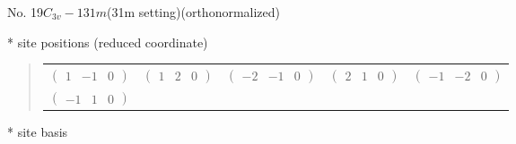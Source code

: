 \documentclass[fleqn,9pt,landscape]{jsarticle}
\begin{document}
\newpage
\begin{center}
\LARGE
No. 19\quad$C_{3v}-1$\quad$31m$\quad(31m setting)\quad[ trigonal ] (orthonormalized)
\end{center}
\vspace{5mm}
* site positions (reduced coordinate)
\begin{quote}
\begin{tabular}{ccccc}
$ \begin{pmatrix} 1 & -1 & 0 \end{pmatrix} $ & $ \begin{pmatrix} 1 & 2 & 0 \end{pmatrix} $ & $ \begin{pmatrix} -2 & -1 & 0 \end{pmatrix} $ & $ \begin{pmatrix} 2 & 1 & 0 \end{pmatrix} $ & $ \begin{pmatrix} -1 & -2 & 0 \end{pmatrix} $ \\
$ \begin{pmatrix} -1 & 1 & 0 \end{pmatrix} $ & $  $ & $  $ & $  $ & $  $
\end{tabular}
\end{quote}
* site basis
\end{document}
